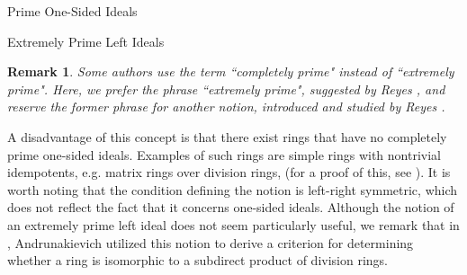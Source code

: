 \documentclass[11pt,a4paper]{article}
\theoremstyle{theorem}
\newtheorem{remark}{Remark}[section]
\numberwithin{equation}{section}
\begin{document}
\begin{section}{Prime One-Sided Ideals}
\begin{subsection}{Extremely Prime Left Ideals}
 	\begin{remark}
 		Some authors use the term ``completely prime" instead of ``extremely prime". Here, we prefer the phrase ``extremely prime", suggested by  Reyes \cite{reyes2010one}, and reserve the former phrase for another notion, introduced and studied by  Reyes \cite{reyes2010one}.   
 	\end{remark}
 	A disadvantage of this concept is that there exist rings that have no completely prime one-sided ideals. Examples of such rings are simple rings with nontrivial idempotents, e.g. matrix rings over division rings, (for a proof of this, see \cite[Proposition 2.4]{reyes2010one}). It is worth noting that the condition defining the notion is left-right symmetric, which does not reflect the fact that it concerns one-sided ideals. Although the notion of an extremely prime left ideal does not seem particularly useful, we remark that in \cite{andrunakievich1984completely}, Andrunakievich utilized this notion to derive a criterion for determining whether a ring is isomorphic to a subdirect product of division rings.  


\end{subsection}
\end{section}
\end{document}
